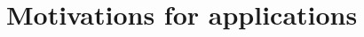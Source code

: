 \documentclass[12pt]{article}
\begin{document}
\section{Motivations for applications}
\end{document}

